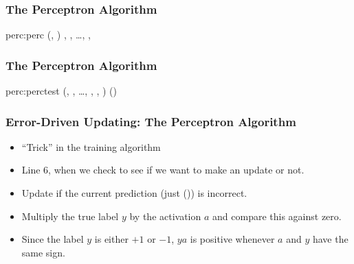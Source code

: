 \documentclass[trans]{beamer}
\begin{document}
\begin{frame}
  \frametitle{The Perceptron Algorithm}

\newalgorithm%
  {perc:perc}%
  {(, )}
  {
\ENDIF
\ENDFOR
\ENDFOR
\RETURN {}, , \dots, , 
}
\end{frame}

\begin{frame}
  \frametitle{The Perceptron Algorithm}
\newalgorithm%
  {perc:perctest}%
  {(, , \dots, , , \VAR{$\hat\vx$})}
  {
\RETURN {}()
}
\end{frame}

\begin{frame}
  \frametitle{Error-Driven Updating: The Perceptron Algorithm}
\begin{itemize}
\item
``Trick'' in the training algorithm
\item Line 6, when we check to see if we
want to make an update or not.
\item  Update if the
current prediction (just ()) is incorrect. 
\item Multiply the true label $y$ by the activation $a$ and compare
this against zero. 
\item Since the label $y$ is either $+1$ or $-1$,  $ya$ is positive whenever $a$ and $y$ have
the same sign.  
\end{itemize}
\end{frame}
\end{document}
